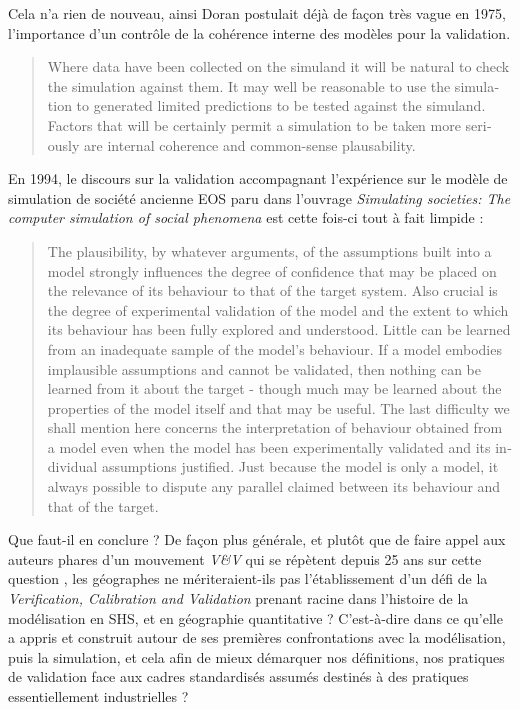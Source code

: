 Cela n'a rien de nouveau, ainsi Doran postulait déjà de façon très vague en 1975, l'importance d'un contrôle de la cohérence interne des modèles pour la validation.

\foreignblockquote{english}{Where data have been collected on the simuland it will be natural to check the simulation against them. It may well be reasonable to use the simulation to generated limited predictions to be tested against the simuland. Factors that will be certainly permit a simulation to be taken more seriously are internal coherence and common-sense plausability.}

En 1994, le discours sur la validation accompagnant l'expérience sur le modèle de simulation de société ancienne EOS paru dans l'ouvrage \textit{Simulating societies: The computer simulation of social phenomena} est cette fois-ci tout à fait limpide :

\foreignblockquote{english}[{\cite[10-12]{Doran1994}}]{The plausibility, by whatever arguments, of the assumptions built into a model strongly influences the degree of confidence that may be placed on the relevance of its behaviour to that of the target system. Also crucial is the degree of experimental validation of the model and the extent to which its behaviour has been fully explored and understood. Little can be learned from an inadequate sample of the model's behaviour. If a model embodies implausible assumptions and cannot be validated, then nothing can be learned from it about the target - though much may be learned about the properties of the model itself and that may be useful. The last difficulty we shall mention here concerns the interpretation of behaviour obtained from a model even when the model has been experimentally validated and its individual assumptions justified. Just because the model is only a model, it always possible to dispute any parallel claimed between its behaviour and that of the target.}

Que faut-il en conclure ? De façon plus générale, et plutôt que de faire appel aux auteurs phares d'un mouvement \textit{V\&V} qui se répètent depuis 25 ans sur cette question \autocite{Sargent1983, Sargent2010}, les géographes ne mériteraient-ils pas l'établissement d'un défi de la \textit{Verification, Calibration and Validation} prenant racine dans l'histoire de la modélisation en SHS, et en géographie quantitative ? C'est-à-dire dans ce qu'elle a appris et construit autour de ses premières confrontations avec la modélisation, puis la simulation, et cela afin de mieux démarquer nos définitions, nos pratiques de validation face aux cadres standardisés assumés destinés à des pratiques essentiellement industrielles ?

